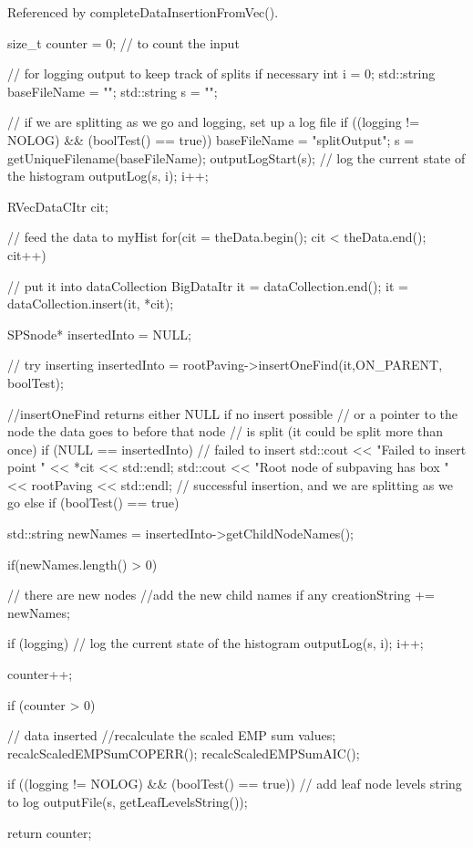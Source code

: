\-Referenced by complete\-Data\-Insertion\-From\-Vec().


\begin{DoxyCode}
{
    size_t counter = 0;    // to count the input

    // for logging output to keep track of splits if necessary
    int i = 0;
    std::string baseFileName = "";
    std::string s = "";

    // if we are splitting as we go and logging, set up a log file
    if ((logging != NOLOG) && (boolTest() == true)) {
        baseFileName = "splitOutput";
        s = getUniqueFilename(baseFileName);
        outputLogStart(s);
        // log the current state of the histogram
        outputLog(s, i);
        i++;
    }

    RVecDataCItr cit;

    // feed the data to myHist
    for(cit = theData.begin(); cit < theData.end(); cit++) {

        // put it into dataCollection
        BigDataItr it = dataCollection.end();
        it = dataCollection.insert(it, *cit);

        SPSnode* insertedInto = NULL;

        // try inserting
        insertedInto =
                rootPaving->insertOneFind(it,ON_PARENT, boolTest);

        //insertOneFind returns either NULL if no insert possible
        // or a pointer to the node the data goes to before that node
        // is split (it could be split more than once)
        if (NULL == insertedInto) { // failed to insert
            std::cout << "Failed to insert point "
                << *cit << std::endl;
            std::cout << "Root node of subpaving has box "
                << rootPaving << std::endl;
        }
        // successful insertion, and we are splitting as we go
        else if (boolTest() == true) {
            std::string newNames = insertedInto->getChildNodeNames();

            if(newNames.length() > 0) { // there are new nodes
                //add the new child names if any
                creationString += newNames;

                if (logging) { // log the current state of the histogram
                    outputLog(s, i);
                    i++;
                }
            }
       }

        counter++;
    }

    if (counter > 0) { // data inserted
        //recalculate the scaled EMP sum values;
        recalcScaledEMPSumCOPERR();
        recalcScaledEMPSumAIC();

        if ((logging != NOLOG) && (boolTest() == true))  {
            // add leaf node levels string to log
            outputFile(s, getLeafLevelsString());
        }
    }

    return counter;
}
\end{DoxyCode}
